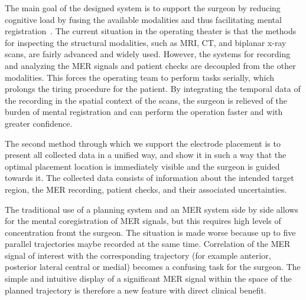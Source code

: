 \documentclass{vgtc}                          %
\begin{document}

The main goal of the designed system is to support the surgeon by reducing cognitive load by fusing the available modalities and thus facilitating mental registration~\cite{Tory1998}. The current situation in the operating theater is that the methods for inspecting the structural modalities, such as MRI, CT, and biplanar x-ray scans, are fairly advanced and widely used. However, the systems for recording and analyzing the MER signals and patient checks are decoupled from the other modalities. This forces the operating team to perform tasks serially, which prolongs the tiring procedure for the patient. By integrating the temporal data of the recording in the spatial context of the scans, the surgeon is relieved of the burden of mental registration and can perform the operation faster and with greater confidence.


The second method through which we support the electrode placement is to present all collected data in a unified way, and show it in such a way that the optimal placement location is immediately visible and the surgeon is guided towards it. The collected data consists of information about the intended target region, the MER recording, patient checks, and their associated uncertainties.

The traditional use of a planning system and an MER system side by side allows for the mental coregistration of MER signals, but this requires high levels of concentration fromt the surgeon. The situation is made worse because up to five parallel trajectories maybe recorded at the same time. Correlation of the MER signal of interest with the corresponding trajectory (for example anterior, posterior lateral central or medial) becomes a confusing task for the surgeon. The simple and intuitive display of a significant MER signal within the space of the planned trajectory is therefore a new feature with direct clinical benefit.   
\end{document}
